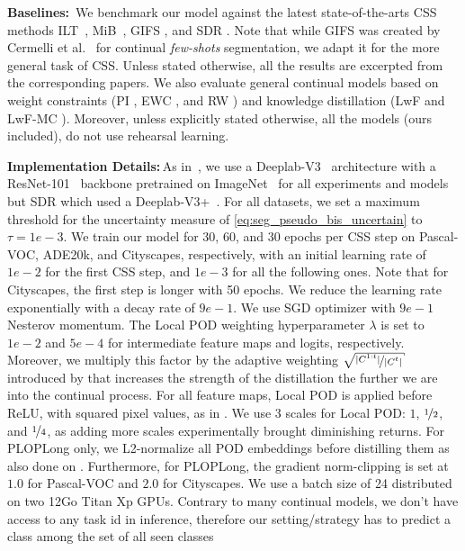 

\noindent\textbf{Baselines:\,} We benchmark our model against the latest state-of-the-arts \ac{CSS}
methods ILT~\cite{michieli2019ilt}, MiB~\cite{cermelli2020modelingthebackground}, GIFS
\cite{cermelli2020fewshotcontinualsegm}, and SDR \cite{michieli2021sdr}. Note that while GIFS was
created by Cermelli et al.~\cite{cermelli2020fewshotcontinualsegm} for continual \textit{few-shots}
segmentation, we adapt it for the more general task of \ac{CSS}. Unless stated otherwise, all the results
are excerpted from the corresponding papers. We also evaluate general continual models based on
weight constraints (PI \cite{zenke2017synaptic_intelligence}, EWC \cite{kirkpatrick2017ewc}, and RW
\cite{chaudhry2018riemannien_walk}) and knowledge distillation (LwF \cite{li2018lwf} and LwF-MC
\cite{rebuffi2017icarl}). Moreover, unless explicitly stated otherwise, all the models (ours
included), do not use rehearsal learning.


\noindent\textbf{Implementation Details:\,}As in~\cite{cermelli2020modelingthebackground}, we use a
Deeplab-V3~\cite{chen2017deeplabv3} architecture with a ResNet-101~\cite{he2016resnet} backbone
pretrained on ImageNet~\cite{deng2009imagenet} for all experiments and models but SDR
\cite{michieli2021sdr} which used a Deeplab-V3+~\cite{chen2018deeplabv3plus}. For all datasets, we
set a maximum threshold for the uncertainty measure of \autoref{eq:seg_pseudo_bis_uncertain} to
$\tau=1e-3$. We train our model for 30, 60, and 30 epochs per \ac{CSS} step on Pascal-VOC, ADE20k, and
Cityscapes, respectively, with an initial learning rate of $1e-2$ for the first \ac{CSS} step, and $1e-3$
for all the following ones. Note that for Cityscapes, the first step is longer with 50 epochs. We
reduce the learning rate exponentially with a decay rate of $9e-1$. We use SGD optimizer with $9e-1$
Nesterov momentum. The Local POD weighting hyperparameter $\lambda$ is set to $1e-2$ and $5e-4$ for
intermediate feature maps and logits, respectively. Moreover, we multiply this factor by the
adaptive weighting $\sqrt{\nicefrac{|C^{1:t}|}{|C^{t}|}}$ introduced by \cite{hou2019ucir} that
increases the strength of the distillation the further we are into the continual process. For all
feature maps, Local POD is applied before ReLU, with squared pixel values, as in
\cite{zagoruyko2016distillation_attention,douillard2020podnet}. We use 3 scales for Local POD: $1$,
$\nicefrac{1}{2}$, and $\nicefrac{1}{4}$, as adding more scales experimentally brought diminishing
returns. For PLOPLong only, we L2-normalize all POD embeddings before distilling them as also done
on \cite{douillard2020podnet}. Furthermore, for PLOPLong, the gradient norm-clipping is set at $1.0$
for Pascal-VOC and $2.0$ for Cityscapes. We use a batch size of 24 distributed on two 12Go Titan Xp
GPUs. Contrary to many continual models, we don't have access to any task id in inference, therefore
our setting/strategy has to predict a class among the set of all seen classes

